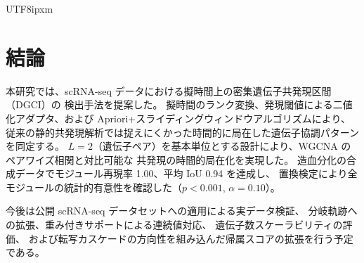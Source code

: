 \documentclass[11pt,a4paper]{article}
\begin{document}
\begin{CJK}{UTF8}{ipxm}
\section{結論}
\label{sec:conclusion}

本研究では、scRNA-seq データにおける擬時間上の密集遺伝子共発現区間（DGCI）の
検出手法を提案した。
擬時間のランク変換、発現閾値による二値化アダプタ、および
Apriori+スライディングウィンドウアルゴリズムにより、
従来の静的共発現解析では捉えにくかった時間的に局在した遺伝子協調パターンを同定する。
$L=2$（遺伝子ペア）を基本単位とする設計により、WGCNA のペアワイズ相関と対比可能な
共発現の時間的局在化を実現した。
造血分化の合成データでモジュール再現率 1.00、平均 IoU 0.94 を達成し、
置換検定により全モジュールの統計的有意性を確認した（$p < 0.001$, $\alpha = 0.10$）。

今後は公開 scRNA-seq データセットへの適用による実データ検証、
分岐軌跡への拡張、重み付きサポートによる連続値対応、
遺伝子数スケーラビリティの評価、
および転写カスケードの方向性を組み込んだ帰属スコアの拡張を行う予定である。




\end{CJK}
\end{document}
